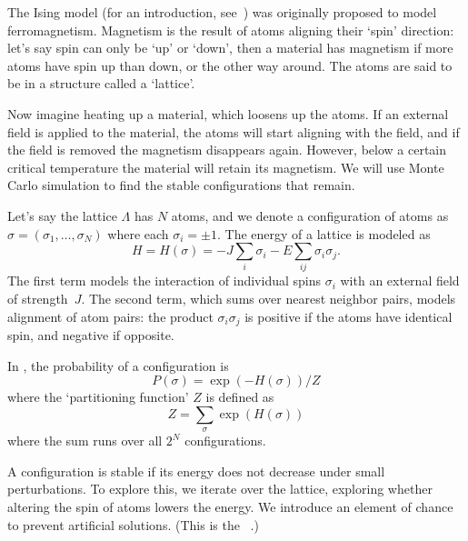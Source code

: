 
The Ising model (for an introduction, see~\cite{Cipra:Ising}) was
originally proposed to model ferromagnetism. Magnetism is the result
of atoms aligning their `spin' direction: let's say spin can only be
`up' or `down', then a material has magnetism if more atoms have spin
up than down, or the other way around. The atoms are said to be in a
structure called a `lattice'.

Now imagine heating up a material, which loosens up the atoms. If an
external field is applied to the material, the atoms will start
aligning with the field, and if the field is removed the magnetism
disappears again. However, below a certain critical temperature the
material will retain its magnetism.
We will use Monte Carlo simulation to find the stable configurations
that remain.

Let's say the lattice $\Lambda$ has $N$ atoms, and we denote a
configuration of atoms as $\sigma=(\sigma_1,\ldots,\sigma_N)$ where
each $\sigma_i=\pm1$.
The energy of a lattice is modeled as
\[ H=H(\sigma)=-J\sum_i\sigma_i-E\sum_{ij}\sigma_i\sigma_j. \]
The first term models the interaction of individual spins $\sigma_i$
with an external field of strength~$J$. The second term, which sums
over nearest neighbor pairs, models
alignment of atom pairs: the product $\sigma_i\sigma_j$ is positive if
the atoms have identical spin, and negative if opposite.

In , the probability of a
configuration is 
\[ P(\sigma) = \exp(-H(\sigma))/Z \]
where the `partitioning function' $Z$ is defined as 
\[ Z = \sum_\sigma \exp(H(\sigma)) \]
where the sum runs over all $2^N$ configurations.

A configuration is stable if its energy does not decrease under small
perturbations. To explore this, we iterate over the lattice, exploring
whether altering the spin of atoms lowers the energy. We introduce an
element of chance to prevent artificial solutions. (This is the
~\cite{Metropolis}.)

